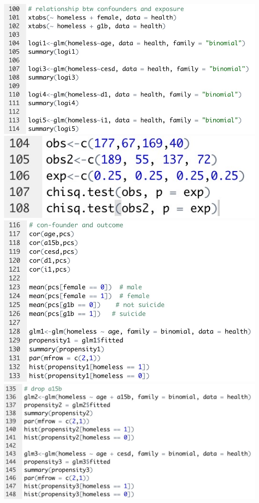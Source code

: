 \documentclass{report}
\begin{document}
\includegraphics[scale=0.3]{f.jpeg}\\
\includegraphics[scale=0.3]{6.jpeg}\\
\includegraphics[scale=0.3]{g.jpeg}\\
\includegraphics[scale=0.3]{h.jpeg}\\
\end{document}
